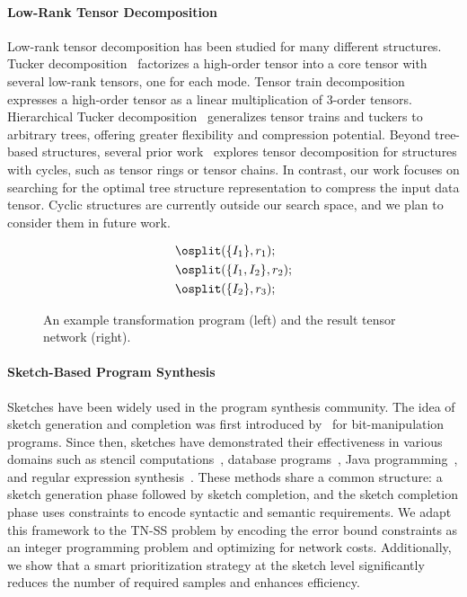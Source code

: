 \paragraph{Low-Rank Tensor Decomposition}
%
Low-rank tensor decomposition has been studied for many different structures.
%
Tucker decomposition~\cite{Tucker_1966,hosvd} factorizes a high-order tensor into a core tensor with several low-rank tensors, one for each mode.
%
Tensor train decomposition~\cite{Oseledets_2011,tt-ice} expresses a high-order tensor as a linear multiplication of 3-order tensors.
%
Hierarchical Tucker decomposition~\cite{hackbusch2009new,ht,falco2021tree} generalizes tensor trains and tuckers to arbitrary trees, offering greater flexibility and compression potential.
%
Beyond tree-based structures, several prior work~\cite{zhao2016tensor,handschuh2015numerical,espig2012note,mickelin2020algorithms,yang2017loop} explores tensor decomposition for structures with cycles, such as tensor rings or tensor chains.
%
In contrast, our work focuses on searching for the optimal tree structure representation to compress the input data tensor.
%
Cyclic structures are currently outside our search space, and we plan to consider them in future work.
%
\begin{figure}[t]
    \centering
    \begin{minipage}{.4\linewidth}
    \centering
    \small
    \begin{align*}
        &\osplit(\{I_1\}, r_1);\\
        &\osplit(\{I_1, I_2\}, r_2);\\
        &\osplit(\{I_2\}, r_3);
    \end{align*}
    \end{minipage}
    \hfill
    \begin{minipage}{.55\linewidth}
    \centering
    \resizebox{.85\linewidth}{!}{
        
    }
    \end{minipage}    
    \caption{An example transformation program (left) and the result tensor network (right).}
    \label{fig:example-program}
\end{figure}
\paragraph{Sketch-Based Program Synthesis}
%
Sketches have been widely used in the program synthesis community.
%
The idea of sketch generation and completion was first introduced by~\citet{sketch05armando} for bit-manipulation programs.
%
Since then, sketches have demonstrated their effectiveness in various domains such as stencil computations~\cite{solar2007sketching}, database programs~\cite{sqlizer}, Java programming~\cite{sypet},  and regular expression synthesis~\cite{regexsyn}.
%
These methods share a common structure: a sketch generation phase followed by sketch completion, and the sketch completion phase uses constraints to encode syntactic and semantic requirements.
%
We adapt this framework to the TN-SS problem by encoding the error bound constraints as an integer programming problem and optimizing for network costs.
%
Additionally, we show that a smart prioritization strategy at the sketch level significantly reduces the number of required samples and enhances efficiency.